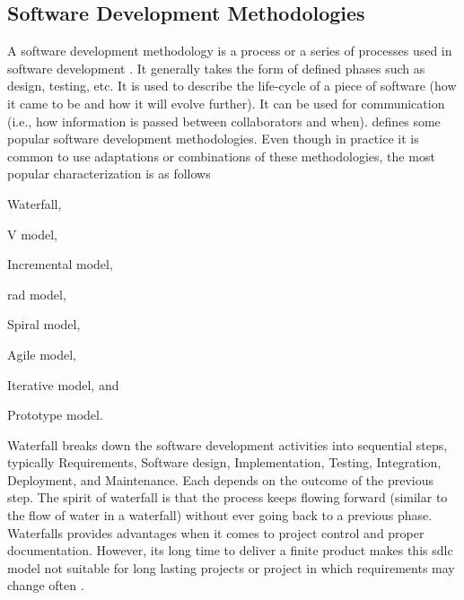 \subsection{Software Development Methodologies}

A software development methodology is a process or a series of processes used in software development \citep{elliott2004global}. It generally takes the form of defined phases \citep{kruchten2004rational} such as design, testing, etc. It is used to describe the life-cycle of a piece of software (how it came to be and how it will evolve further). It can be used for communication (i.e., how information is passed between collaborators and when).   defines some popular software development methodologies. Even though in practice it is common to use adaptations or combinations of these methodologies, the most popular characterization is as follows \begin{inparaenum} [\itshape i)]
	\item Waterfall, 
	\item V model,
	\item Incremental model,
	\item \gls{rad} model,
	\item Spiral model,
	\item Agile model,
	\item Iterative model, and
	\item Prototype model.
\end{inparaenum} 

Waterfall \citep{DBLP:conf/icse/BellT76} breaks down the software development activities into sequential steps, typically Requirements, 
Software design,  Implementation, Testing, Integration, Deployment,  and Maintenance. Each depends on the outcome of the previous step. The spirit of waterfall is that the process keeps flowing forward (similar to the flow of water in a waterfall) without ever going back to a previous phase. Waterfalls provides advantages when it comes to project control 
and proper documentation. However, its long time to deliver a finite product makes this \gls{sdlc} model not suitable for long lasting projects or project in which requirements may change often \citep{DBLP:conf/profes/PetersenWB09}. 

